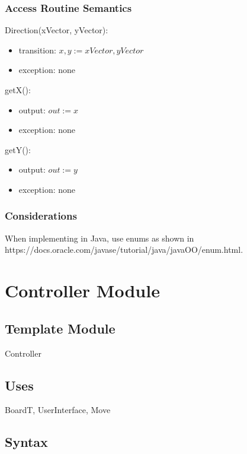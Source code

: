 \documentclass[12pt]{article}
\begin{document}
\subsubsection* {Access Routine Semantics}

\noindent Direction(xVector, yVector):
\begin{itemize}
\item transition: $x, y := xVector, yVector$
\item exception: none
\end{itemize}

\noindent getX():
\begin{itemize}
\item output: $out := x$
\item exception: none
\end{itemize}

\noindent getY():
\begin{itemize}
\item output: $out := y$
\item exception: none
\end{itemize}

\subsubsection* {Considerations}

When implementing in Java, use enums as shown in \\
https://docs.oracle.com/javase/tutorial/java/javaOO/enum.html.


\newpage


\section* {Controller Module}

\subsection*{Template Module}

Controller

\subsection* {Uses}

BoardT, UserInterface, Move

\subsection* {Syntax}
\end{document}
